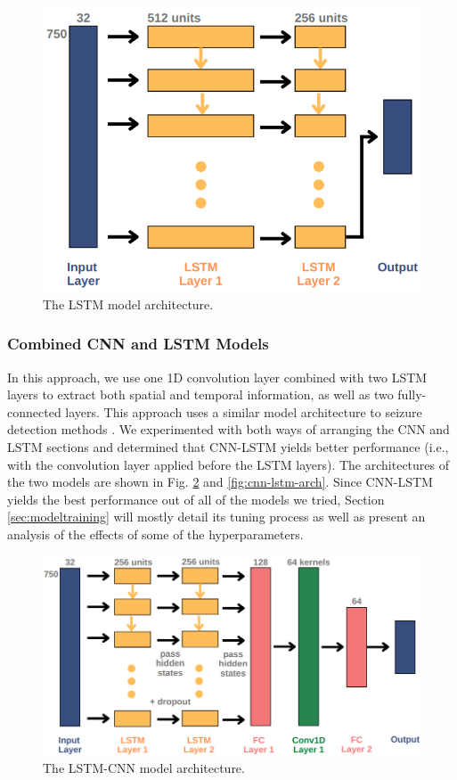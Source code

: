 \documentclass[format=sigconf, nonacm=true, review=false, screen=true]{acmart}
\begin{document}
\begin{figure}[H]
    \centering
    \includegraphics[width=\columnwidth]{figures/lstm-arch.png}
    \caption{The LSTM model architecture.}
    \label{fig:lstm-arch}
\end{figure}

\subsubsection{Combined CNN and LSTM Models}
In this approach, we use one 1D convolution layer combined with two LSTM layers to extract both spatial and temporal information, as well as two fully-connected layers. This approach uses a similar model architecture to seizure detection methods \cite{xu2020seizure}.
We experimented with both ways of arranging the CNN and LSTM sections and determined that CNN-LSTM yields better performance (i.e., with the convolution layer applied before the LSTM layers). The architectures of the two models are shown in Fig. \ref{fig:lstm-cnn-arch} and \ref{fig:cnn-lstm-arch}. Since CNN-LSTM yields the best performance out of all of the models we tried, Section \ref{sec:modeltraining} will mostly detail its tuning process as well as present an analysis of the effects of some of the hyperparameters.

\begin{figure}[H]
    \centering
    \includegraphics[width=\columnwidth]{figures/lstm-cnn-arch.png}
    \caption{The LSTM-CNN model architecture.}
    \label{fig:lstm-cnn-arch}
\end{figure}
\end{document}
